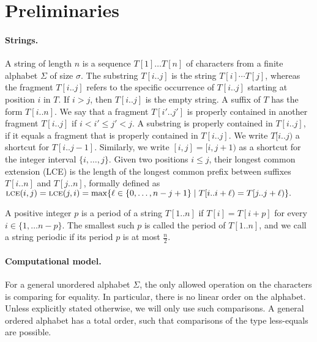 \section{Preliminaries}
\label{square:sec:prelim}

\paragraph{Strings.}
A string of length $n$ is a sequence $T[1] \dots T[n]$ of characters from a finite alphabet $\Sigma$ of size $\sigma$. The substring $T[i..j]$ is the string $T[i] \cdots T[j]$, whereas the fragment $T[i..j]$ refers to the specific occurrence of $T[i..j]$ starting at position $i$ in $T$. If $i > j$, then $T[i..j]$ is the empty string.
A suffix of $T$ has the form $T[i..n]$.
We say that a fragment $T[i'..j']$ is properly contained in another fragment $T[i..j]$ if $i < i' \leq j' < j$.
A substring is properly contained in $T[i..j]$, if it equals a fragment that is properly contained in $T[i..j]$.
We write $T[i..j)$ a shortcut for $T[i..j-1]$. Similarly, we write $[i, j] = [i, j + 1)$ as a shortcut for the integer interval $\{i, \dots, j\}$. Given two positions $i \leq j$, their longest common extension (LCE) is the length of the longest common prefix between suffixes $T[i..n]$ and $T[j..n]$, formally defined as $\textnormal{\textsc{lce}}(i,j) = \textnormal{\textsc{lce}}(j,i) = \max\{\ell \in \{0, \dots, n - j + 1\} \mid T[i..i+\ell) = T[j..j+\ell)\}.$

\begin{definition}
A positive integer $p$ is a period of a string $T[1 .. n]$ if $T[i] = T[i+p]$ for every $i\in \{1, \dots n-p \}$. The smallest such $p$ is called the period of $T[1..n]$, and we call a string periodic if its period $p$ is at most $\frac{n}{2}$.
\end{definition}

\paragraph{Computational model.}
For a general unordered alphabet $\Sigma$, the only allowed operation on the characters is comparing for equality. In particular, there is no
linear order on the alphabet. Unless explicitly stated otherwise, we will only use such comparisons. A general ordered alphabet has a total order, such that comparisons of the type less-equals are possible. 


